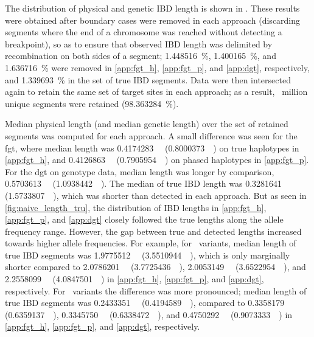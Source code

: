 %

%

The distribution of physical and genetic IBD length is shown in .
These results were obtained after boundary cases were removed in each approach (\ie discarding segments where the end of a chromosome was reached without detecting a breakpoint), so as to ensure that observed IBD length was delimited by recombination on both sides of a segment; \SI{1.448516}{\percent}, \SI{1.400165}{\percent}, and \SI{1.636716}{\percent}
were removed in \ref{app:fgt_h}, \ref{app:fgt_p}, and \ref{app:dgt}, respectively, and \SI{1.339693}{\percent} in the set of true IBD segments.
Data were then intersected again to retain the same set of target sites in each approach; as a result, ~million unique segments were retained (\SI{98.363284}{\percent}).

Median physical length (and median genetic length) over the set of retained segments was computed for each approach.
A small difference was seen for the \gls{fgt}, where median length was
\SI{0.4174283}{\mega\basepair} (\SI{0.8000373}{\centi\morgan})
on true haplotypes in \cref{app:fgt_h}, and
\SI{0.4126863}{\mega\basepair} (\SI{0.7905954}{\centi\morgan})
on phased haplotypes in \cref{app:fgt_p}.
For the \gls{dgt} on genotype data, median length was longer by comparison, \SI{0.5703613}{\mega\basepair} (\SI{1.0938442}{\centi\morgan}).
The median of true IBD length was \SI{0.3281641}{\mega\basepair} (\SI{1.5733807}{\centi\morgan}), which was shorter than detected in each approach.
But as seen in \cref{fig:naive_length_tru}, the distribution of IBD lengths in \ref{app:fgt_h}, \ref{app:fgt_p}, and \ref{app:dgt} closely followed the true lengths along the allele frequency range.
However, the gap between true and detected lengths increased towards higher allele frequencies.
For example, for ~variants, median length of true IBD segments was
\SI{1.9775512}{\mega\basepair} (\SI{3.5510944}{\centi\morgan}),
which is only marginally shorter compared to
\SI{2.0786201}{\mega\basepair} (\SI{3.7725436}{\centi\morgan}),
\SI{2.0053149}{\mega\basepair} (\SI{3.6522954}{\centi\morgan}), and
\SI{2.2558099}{\mega\basepair} (\SI{4.0847501}{\centi\morgan})
in \ref{app:fgt_h}, \ref{app:fgt_p}, and \ref{app:dgt}, respectively.
For ~variants the difference was more pronounced; \ie
median length of true IBD segments was
\SI{0.2433351}{\mega\basepair} (\SI{0.4194589}{\centi\morgan}),
compared to
\SI{0.3358179}{\mega\basepair} (\SI{0.6359137}{\centi\morgan}),
\SI{0.3345750}{\mega\basepair} (\SI{0.6338472}{\centi\morgan}), and
\SI{0.4750292}{\mega\basepair} (\SI{0.9073333}{\centi\morgan})
in \ref{app:fgt_h}, \ref{app:fgt_p}, and \ref{app:dgt}, respectively.


